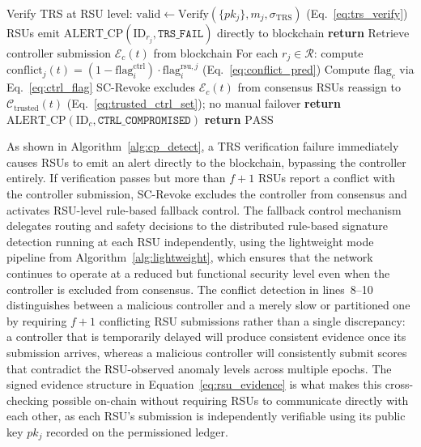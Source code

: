 \documentclass[12pt, a4paper]{report}
\begin{document}
\begin{algorithm}[H]
\caption{Control-Plane Poisoning Detection (\texttt{CP-DETECT})}
\begin{algorithmic}[1]
  \small
  \State Verify TRS at RSU level:
         $\mathrm{valid} \gets
         \mathrm{Verify}(\{pk_j\}, m_j, \sigma_{\mathrm{TRS}})$
         \quad (Eq.~\eqref{eq:trs_verify})
    \State RSUs emit $\mathrm{ALERT\_CP}(\mathrm{ID}_{r_j},
           \texttt{TRS\_FAIL})$ directly to blockchain
    \State \textbf{return}
  \EndIf
  \State Retrieve controller submission $\mathcal{E}_c(t)$
         from blockchain
  \State For each $r_j \in \mathcal{R}$: compute
         $\mathrm{conflict}_j(t) =
         (1 - \mathrm{flag}_i^{\mathrm{ctrl}}) \cdot
         \mathrm{flag}_i^{\mathrm{rsu},j}$
         \hfill (Eq.~\eqref{eq:conflict_pred})
  \State Compute $\mathrm{flag}_c$ via
         Eq.~\eqref{eq:ctrl_flag}
    \State SC-Revoke excludes $\mathcal{E}_c(t)$ from consensus
    \State RSUs reassign to $\mathcal{C}_{\mathrm{trusted}}(t)$
           (Eq.~\eqref{eq:trusted_ctrl_set}); no manual failover
    \State \textbf{return} $\mathrm{ALERT\_CP}
           (\mathrm{ID}_c, \texttt{CTRL\_COMPROMISED})$
  \EndIf
  \State \textbf{return} $\mathrm{PASS}$
  \EndProcedure
\end{algorithmic}
\label{alg:cp_detect}
\end{algorithm}

As shown in Algorithm~\ref{alg:cp_detect}, a TRS verification failure
immediately causes RSUs to emit an alert directly to the blockchain,
bypassing the controller entirely. If verification passes but more
than $f+1$ RSUs report a conflict with the controller submission,
SC-Revoke excludes the controller from consensus and activates
RSU-level rule-based fallback control. The fallback control mechanism
delegates routing and safety decisions to the distributed rule-based
signature detection running at each RSU independently, using the
lightweight mode pipeline from Algorithm~\ref{alg:lightweight}, which
ensures that the network continues to operate at a reduced but
functional security level even when the controller is excluded from
consensus. The conflict detection in lines~8--10 distinguishes between
a malicious controller and a merely slow or partitioned one by
requiring $f+1$ conflicting RSU submissions rather than a single
discrepancy: a controller that is temporarily delayed will produce
consistent evidence once its submission arrives, whereas a malicious
controller will consistently submit scores that contradict the
RSU-observed anomaly levels across multiple epochs. The signed
evidence structure in Equation~\ref{eq:rsu_evidence} is what makes
this cross-checking possible on-chain without requiring RSUs to
communicate directly with each other, as each RSU's submission is
independently verifiable using its public key $pk_j$ recorded on the
permissioned ledger.
\end{document}
